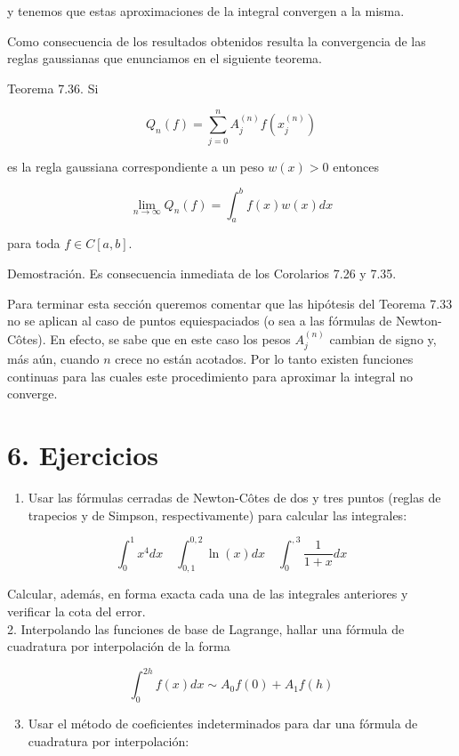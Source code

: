 \documentclass[10pt]{article}
\begin{document}
y tenemos que estas aproximaciones de la integral convergen a la misma.

Como consecuencia de los resultados obtenidos resulta la convergencia de las reglas gaussianas que enunciamos en el siguiente teorema.

Teorema 7.36. Si

$$
Q_{n}(f)=\sum_{j=0}^{n} A_{j}^{(n)} f\left(x_{j}^{(n)}\right)
$$

es la regla gaussiana correspondiente a un peso $w(x)>0$ entonces

$$
\lim _{n \rightarrow \infty} Q_{n}(f)=\int_{a}^{b} f(x) w(x) d x
$$

para toda $f \in C[a, b]$.

Demostración. Es consecuencia inmediata de los Corolarios 7.26 y 7.35.

Para terminar esta sección queremos comentar que las hipótesis del Teorema 7.33 no se aplican al caso de puntos equiespaciados (o sea a las fórmulas de Newton-Côtes). En efecto, se sabe que en este caso los pesos $A_{j}^{(n)}$ cambian de signo y, más aún, cuando $n$ crece no están acotados. Por lo tanto existen funciones continuas para las cuales este procedimiento para aproximar la integral no converge.

\section*{6. Ejercicios}
\begin{enumerate}
  \item Usar las fórmulas cerradas de Newton-Côtes de dos y tres puntos (reglas de trapecios y de Simpson, respectivamente) para calcular las integrales:
\end{enumerate}

$$
\int_{0}^{1} x^{4} d x \quad \int_{0,1}^{0,2} \ln (x) d x \quad \int_{0}^{, 3} \frac{1}{1+x} d x
$$

Calcular, además, en forma exacta cada una de las integrales anteriores y verificar la cota del error.\\
2. Interpolando las funciones de base de Lagrange, hallar una fórmula de cuadratura por interpolación de la forma

$$
\int_{0}^{2 h} f(x) d x \sim A_{0} f(0)+A_{1} f(h)
$$

\begin{enumerate}
  \setcounter{enumi}{2}
  \item Usar el método de coeficientes indeterminados para dar una fórmula de cuadratura por interpolación:
\end{enumerate}
\end{document}
